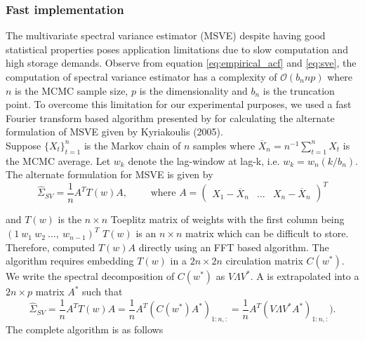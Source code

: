 \documentclass[11pt]{article}
\theoremstyle{remark}
\begin{document}

\subsubsection{Fast implementation} %
\label{ssub:fast_implementation}

The multivariate spectral variance estimator (MSVE) despite having good statistical properties poses application limitations due to slow computation and high storage demands. Observe from equation \ref{eq:empirical_acf} and \ref{eq:sve}, the computation of spectral variance estimator has a complexity of $\mathcal{O}(b_n n p)$ where $n$ is the MCMC sample size, $p$ is the dimensionality and $b_n$ is the truncation point. To overcome this limitation for our experimental purposes, we used a fast Fourier transform based algorithm presented by \cite{heberle2017fast} for calculating the alternate formulation of MSVE given by Kyriakoulis (2005).\\

Suppose $\{X_t\}_{t=1}^n$ is the Markov chain of $n$ samples where $\overline{X}_n = n^{-1}\sum_{t=1}^{n}X_t$ is the MCMC average. Let $w_k$ denote the lag-window at lag-k, i.e. $w_k = w_n(k/b_n)$. The alternate formulation for MSVE is given by
%
\[
    \hat{\Sigma}_{SV} = \dfrac{1}{n}A^T T(w) A, \qquad \textrm{ where } A = \begin{pmatrix}
    X_1 - \overline{X}_n  & \dots & X_n - \overline{X}_n
\end{pmatrix}^T
\]

and $T(w)$ is the $n \times n$ Toeplitz matrix of weights with the first column being $(1 ~ w_1 ~ w_2 ~ \dots, ~ w_{n-1})^T$
$T(w)$ is an $n \times n$ matrix which can be difficult to store. Therefore, \cite{heberle2017fast} computed $T(w)A$ directly using an FFT based algorithm. The algorithm requires embedding $T(w)$ in a $2n \times 2n$ circulation matrix $C(w^*)$. We write the spectral decomposition of $C(w^*)$ as $V\Lambda V^*$. A is extrapolated into a $2n \times p$ matrix $A^*$ such that
\[
    \hat{\Sigma}_{SV} = \dfrac{1}{n} A^T T(w) A = \dfrac{1}{n} A^T (C(w^*) A^*)_{1:n, :} = \dfrac{1}{n} A^T (V \Lambda V^* A^*)_{1:n, :}).
\]
The complete algorithm is as follows
\end{document}

